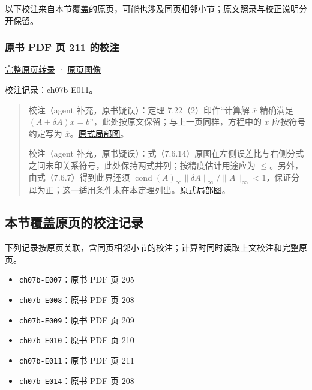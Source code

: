 \documentclass[
  10pt,
  fontset=fandol]{ctexart}
\providecommand{\tightlist}{%
  \setlength{\itemsep}{0pt}\setlength{\parskip}{0pt}}
\begin{document}
以下校注来自本节覆盖的原页，可能也涉及同页相邻小节；原文照录与校正说明分开保留。

\subsubsection{原书 PDF 页 211 的校注}\label{ux539fux4e66-pdf-ux9875-211-ux7684ux6821ux6ce8}

\href{../pages/pdf-211.md}{完整原页转录} · \href{../../source-images/pdf-211.jpeg}{原页图像}

校注记录：ch07b-E011。

\begin{quote}
校注（agent 补充，原书疑误）：定理 7.22（2）印作``计算解 \(\overline x\) 精确满足 \((A+\delta A)x=b\)''，此处按原文保留；与上一页同样，方程中的 \(x\) 应按符号约定写为 \(\overline x\)。\href{../assets/ch07b/211-computed-solution.png}{原式局部图}。

校注（agent 补充，原书疑误）：式（7.6.14）原图在左侧误差比与右侧分式之间未印关系符号，此处保持两式并列；按精度估计用途应为 \(\leqslant\)。另外，由式（7.6.7）得到此界还须 \(\operatorname{cond}(A)_\infty\|\delta A\|_\infty/\|A\|_\infty<1\)，保证分母为正；这一适用条件未在本定理列出。\href{../assets/ch07b/211-error-estimate.png}{原式局部图}。
\end{quote}

\subsection{本节覆盖原页的校注记录}\label{ux672cux8282ux8986ux76d6ux539fux9875ux7684ux6821ux6ce8ux8bb0ux5f55}

下列记录按原页关联，含同页相邻小节的校注；计算时同时读取上文校注和完整原页。

\begin{itemize}
\tightlist
\item
  \texttt{ch07b-E007}：原书 PDF 页 205
\item
  \texttt{ch07b-E008}：原书 PDF 页 208
\item
  \texttt{ch07b-E009}：原书 PDF 页 209
\item
  \texttt{ch07b-E010}：原书 PDF 页 210
\item
  \texttt{ch07b-E011}：原书 PDF 页 211
\item
  \texttt{ch07b-E014}：原书 PDF 页 208
\end{itemize}
\end{document}
